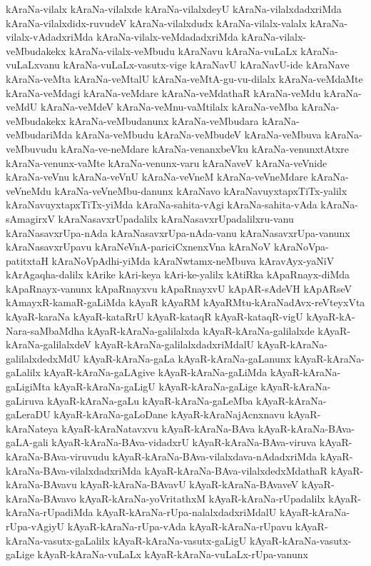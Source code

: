 {kAraNa-vilalx
kAraNa-vilalxde
kAraNa-vilalxdeyU
kAraNa-vilalxdadxriMda
kAraNa-vilalxdidx-ruvudeV
kAraNa-vilalxdudx
kAraNa-vilalx-valalx
kAraNa-vilalx-vAdadxriMda
kAraNa-vilalx-veMdadadxriMda
kAraNa-vilalx-veMbudakekx
kAraNa-vilalx-veMbudu
kAraNavu
kAraNa-vuLaLx
kAraNa-vuLaLxvanu
kAraNa-vuLaLx-vasutx-vige
kAraNavU
kAraNavU-ide
kAraNave
kAraNa-veMta
kAraNa-veMtalU
kAraNa-veMtA-gu-vu-dilalx
kAraNa-veMdaMte
kAraNa-veMdagi
kAraNa-veMdare
kAraNa-veMdathaR
kAraNa-veMdu
kAraNa-veMdU
kAraNa-veMdeV
kAraNa-veMnu-vaMtilalx
kAraNa-veMba
kAraNa-veMbudakekx
kAraNa-veMbudanunx
kAraNa-veMbudara
kAraNa-veMbudariMda
kAraNa-veMbudu
kAraNa-veMbudeV
kAraNa-veMbuva
kAraNa-veMbuvudu
kAraNa-ve-neMdare
kAraNa-venanxbeVku
kAraNa-venunxtAtxre
kAraNa-venunx-vaMte
kAraNa-venunx-varu
kAraNaveV
kAraNa-veVnide
kAraNa-veVnu
kAraNa-veVnU
kAraNa-veVneM
kAraNa-veVneMdare
kAraNa-veVneMdu
kAraNa-veVneMbu-danunx
kAraNavo
kAraNavuyxtapxTiTx-yalilx
kAraNavuyxtapxTiTx-yiMda
kAraNa-sahita-vAgi
kAraNa-sahita-vAda
kAraNa-sAmagirxV
kAraNasavxrUpadalilx
kAraNasavxrUpadalilxru-vanu
kAraNasavxrUpa-nAda
kAraNasavxrUpa-nAda-vanu
kAraNasavxrUpa-vanunx
kAraNasavxrUpavu
kAraNeVnA-pariciCxnenxVna
kAraNoV
kAraNoVpa-patitxtaH
kAraNoVpAdhi-yiMda
kAraNwtamx-neMbuva
kAravAyx-yaNiV
kArAgaqha-dalilx
kArike
kAri-keya
kAri-ke-yalilx
kAtiRka
kApaRnayx-diMda
kApaRnayx-vanunx
kApaRnayxvu
kApaRnayxvU
kApAR-sAdeVH
kApARseV
kAmayxR-kamaR-gaLiMda
kAyaR
kAyaRM
kAyaRMtu-kAraNadAvx-reVteyxVta
kAyaR-karaNa
kAyaR-kataRrU
kAyaR-kataqR
kAyaR-kataqR-vigU
kAyaR-kA-Nara-saMbaMdha
kAyaR-kAraNa-galilalxda
kAyaR-kAraNa-galilalxde
kAyaR-kAraNa-galilalxdeV
kAyaR-kAraNa-galilalxdadxriMdalU
kAyaR-kAraNa-galilalxdedxMdU
kAyaR-kAraNa-gaLa
kAyaR-kAraNa-gaLanunx
kAyaR-kAraNa-gaLalilx
kAyaR-kAraNa-gaLAgive
kAyaR-kAraNa-gaLiMda
kAyaR-kAraNa-gaLigiMta
kAyaR-kAraNa-gaLigU
kAyaR-kAraNa-gaLige
kAyaR-kAraNa-gaLiruva
kAyaR-kAraNa-gaLu
kAyaR-kAraNa-gaLeMba
kAyaR-kAraNa-gaLeraDU
kAyaR-kAraNa-gaLoDane
kAyaR-kAraNajAcnxnavu
kAyaR-kAraNateya
kAyaR-kAraNatavxvu
kAyaR-kAraNa-BAva
kAyaR-kAraNa-BAva-gaLA-gali
kAyaR-kAraNa-BAva-vidadxrU
kAyaR-kAraNa-BAva-viruva
kAyaR-kAraNa-BAva-viruvudu
kAyaR-kAraNa-BAva-vilalxdava-nAdadxriMda
kAyaR-kAraNa-BAva-vilalxdadxriMda
kAyaR-kAraNa-BAva-vilalxdedxMdathaR
kAyaR-kAraNa-BAvavu
kAyaR-kAraNa-BAvavU
kAyaR-kAraNa-BAvaveV
kAyaR-kAraNa-BAvavo
kAyaR-kAraNa-yoVritathxM
kAyaR-kAraNa-rUpadalilx
kAyaR-kAraNa-rUpadiMda
kAyaR-kAraNa-rUpa-nalalxdadxriMdalU
kAyaR-kAraNa-rUpa-vAgiyU
kAyaR-kAraNa-rUpa-vAda
kAyaR-kAraNa-rUpavu
kAyaR-kAraNa-vasutx-gaLalilx
kAyaR-kAraNa-vasutx-gaLigU
kAyaR-kAraNa-vasutx-gaLige
kAyaR-kAraNa-vuLaLx
kAyaR-kAraNa-vuLaLx-rUpa-vanunx
}
